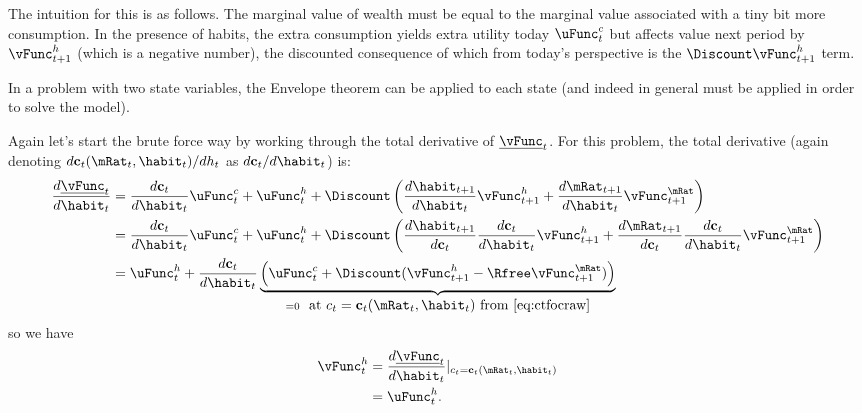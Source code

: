 The intuition for this is as follows.  The marginal value of wealth
must be equal to the marginal value associated with a tiny bit more
consumption.  In the presence of habits, the extra consumption yields
extra utility today $\uFunc^{c}_{t}$ but affects value next period by
$\vFunc^{h}_{t+1}$ (which is a negative number), the discounted consequence
of which from today's perspective is the $\Discount \vFunc^{h}_{t+1}$ term.


In a problem with two state variables, the Envelope theorem can be
applied to each state (and indeed in general must be applied in
order to solve the model).

Again let's start the brute force way by working through the total
derivative of $\underline{\vFunc}_{t}$.  For this problem, the total derivative
(again denoting $d \mathbf{c}_{t}(\mRat_{t},\habit_{t})/d {h}_{t}$ as $d \mathbf{c}_{t}/d \habit_{t}$) is:
\begin{equation}\begin{gathered}\begin{aligned}
        \frac{d \underline{\vFunc}_{t}}{d \habit_{t}} & =  \frac{d \mathbf{c}_{t}}{d \habit_{t}} \uFunc^{c}_{t}       + \uFunc^{h}_{t}
        + \Discount \left( \frac{d \habit_{t+1}}{d \habit_{t}}\vFunc_{t+1}^{h}
        + \frac{d \mRat_{t+1}}{d \habit_{t}} \vFunc_{t+1}^{\mRat}\right) \\
 & =  \frac{d \mathbf{c}_{t}}{d \habit_{t}} \uFunc^{c}_{t}        + \uFunc^{h}_{t}
        + \Discount \left(\frac{d \habit_{t+1}}{d \mathbf{c}_{t}}\frac{d \mathbf{c}_{t}}{d \habit_{t}} \vFunc_{t+1}^{h}
        + \frac{d \mRat_{t+1}}{d \mathbf{c}_{t}}\frac{d \mathbf{c}_{t}}{d \habit_{t}} \vFunc_{t+1}^{\mRat}
        \right) \\
 & =  \uFunc^{h}_{t} +
 \frac{d \mathbf{c}_{t}}{d \habit_{t}} \underbrace{\left(\uFunc^{c}_{t}
        + \Discount (\vFunc_{t+1}^{h}
        - \Rfree \vFunc_{t+1}^{\mRat} )\right)}_{= 0~\mbox{ at $c_{t}=\mathbf{c}_{t}(\mRat_{t},\habit_{t})$  from \eqref{eq:ctfocraw}}}
\end{aligned}\end{gathered}\end{equation}
so we have
\begin{equation}\begin{gathered}\begin{aligned}
        \vFunc_{t}^{h} & =  \frac{d \underline{\vFunc}_{t}}{d \habit_{t}}|_{c_{t} = \mathbf{c}_{t}(\mRat_{t},\habit_{t})}
\\       & =  \uFunc_{t}^{h}.
\end{aligned}\end{gathered}\end{equation}

